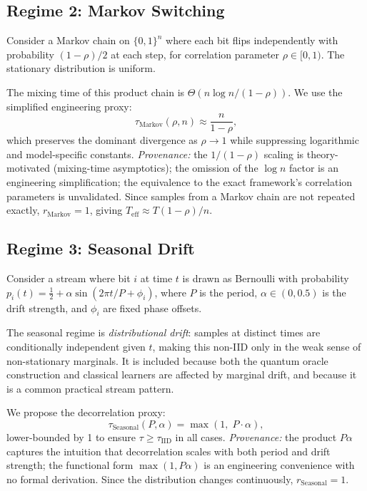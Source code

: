 \documentclass[sensors,article,submit,pdftex,moreauthors]{Definitions/mdpi}
\newcommand{\Teff}{T_{\mathrm{eff}}}
\begin{document}
\subsection{Regime 2: Markov Switching}

Consider a Markov chain on $\{0,1\}^n$ where each bit flips independently with probability $(1 - \rho)/2$ at each step, for correlation parameter $\rho \in [0, 1)$. The stationary distribution is uniform.

The mixing time of this product chain is $\Theta(n \log n / (1 - \rho))$. We use the simplified engineering proxy:
\begin{equation}
    \tau_{\text{Markov}}(\rho, n) \approx \frac{n}{1 - \rho},
    \label{eq:tau_markov}
\end{equation}
which preserves the dominant divergence as $\rho \to 1$ while suppressing logarithmic and model-specific constants. \emph{Provenance:} the $1/(1{-}\rho)$ scaling is theory-motivated (mixing-time asymptotics); the omission of the $\log n$ factor is an engineering simplification; the equivalence to the exact framework's correlation parameters is unvalidated. Since samples from a Markov chain are not repeated exactly, $r_{\text{Markov}} = 1$, giving $\Teff \approx T(1{-}\rho)/n$.

\subsection{Regime 3: Seasonal Drift}

Consider a stream where bit $i$ at time $t$ is drawn as Bernoulli with probability $p_i(t) = \tfrac{1}{2} + \alpha \sin(2\pi t/P + \phi_i)$, where $P$ is the period, $\alpha \in (0, 0.5)$ is the drift strength, and $\phi_i$ are fixed phase offsets.

The seasonal regime is \emph{distributional drift}: samples at distinct times are conditionally independent given $t$, making this non\nobreakdash-IID only in the weak sense of non-stationary marginals. It is included because both the quantum oracle construction and classical learners are affected by marginal drift, and because it is a common practical stream pattern.

We propose the decorrelation proxy:
\begin{equation}
    \tau_{\text{Seasonal}}(P, \alpha) = \max(1,\; P \cdot \alpha),
    \label{eq:tau_seasonal}
\end{equation}
lower-bounded by 1 to ensure $\tau \geq \tau_{\text{IID}}$ in all cases. \emph{Provenance:} the product $P\alpha$ captures the intuition that decorrelation scales with both period and drift strength; the functional form $\max(1, P\alpha)$ is an engineering convenience with no formal derivation. Since the distribution changes continuously, $r_{\text{Seasonal}} = 1$.
\end{document}
